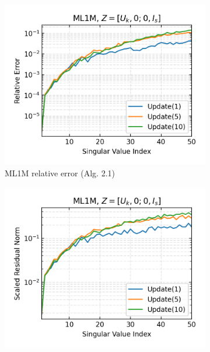 
\begin{figure}[H]
  \centering
  \begin{subfigure}[b]{0.48\textwidth}
    \centering
    \includegraphics[width=\textwidth]{figures/ml1m/ML1M_zha-simon_n_batches_10_k_dims_50_rel_err.png}
    \caption{ML1M relative error (Alg. 2.1)}
  \end{subfigure}
  \hfill
  \begin{subfigure}[b]{0.48\textwidth}
    \centering
    \includegraphics[width=\textwidth]{figures/ml1m/ML1M_zha-simon_n_batches_10_k_dims_50_res_norm.png}

\end{subfigure}
\end{figure}
